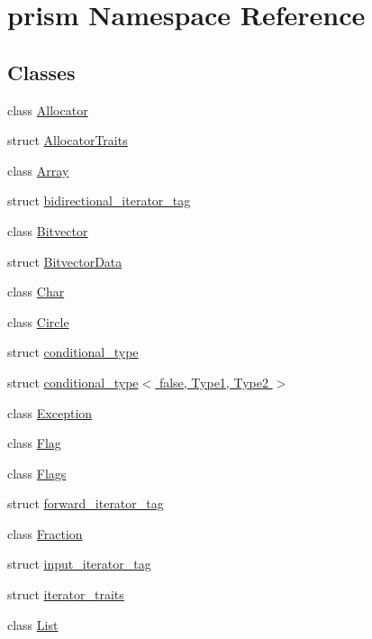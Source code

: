 \hypertarget{namespaceprism}{}\section{prism Namespace Reference}
\label{namespaceprism}
\subsection*{Classes}
\begin{DoxyCompactItemize}
\item 
class \hyperlink{classprism_1_1_allocator}{Allocator}
\item 
struct \hyperlink{structprism_1_1_allocator_traits}{Allocator\+Traits}
\item 
class \hyperlink{classprism_1_1_array}{Array}
\item 
struct \hyperlink{structprism_1_1bidirectional__iterator__tag}{bidirectional\+\_\+iterator\+\_\+tag}
\item 
class \hyperlink{classprism_1_1_bitvector}{Bitvector}
\item 
struct \hyperlink{structprism_1_1_bitvector_data}{Bitvector\+Data}
\item 
class \hyperlink{classprism_1_1_char}{Char}
\item 
class \hyperlink{classprism_1_1_circle}{Circle}
\item 
struct \hyperlink{structprism_1_1conditional__type}{conditional\+\_\+type}
\item 
struct \hyperlink{structprism_1_1conditional__type_3_01false_00_01_type1_00_01_type2_01_4}{conditional\+\_\+type$<$ false, Type1, Type2 $>$}
\item 
class \hyperlink{classprism_1_1_exception}{Exception}
\item 
class \hyperlink{classprism_1_1_flag}{Flag}
\item 
class \hyperlink{classprism_1_1_flags}{Flags}
\item 
struct \hyperlink{structprism_1_1forward__iterator__tag}{forward\+\_\+iterator\+\_\+tag}
\item 
class \hyperlink{classprism_1_1_fraction}{Fraction}
\item 
struct \hyperlink{structprism_1_1input__iterator__tag}{input\+\_\+iterator\+\_\+tag}
\item 
struct \hyperlink{structprism_1_1iterator__traits}{iterator\+\_\+traits}
\item 
class \hyperlink{classprism_1_1_list}{List}
\item 

\end{DoxyCompactItemize}
